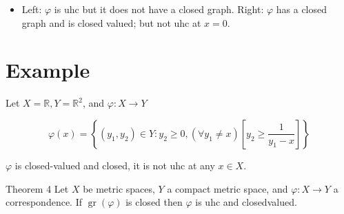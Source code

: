 \documentclass[10pt]{article}
\begin{document}
\begin{itemize}
  \item Left: $\varphi$ is uhc but it does not have a closed graph. Right: $\varphi$ has a closed graph and is closed valued; but not uhc at $x=0$.
\end{itemize}

\section*{Example}
Let $X=\mathbb{R}, Y=\mathbb{R}^{2}$, and $\varphi: X \rightarrow Y$

$$
\varphi(x)=\left\{\left(y_{1}, y_{2}\right) \in Y: y_{2} \geq 0,\left(\forall y_{1} \neq x\right)\left[y_{2} \geq \frac{1}{y_{1}-x}\right]\right\}
$$

$\varphi$ is closed-valued and closed, it is not uhc at any $x \in X$.

Theorem 4 Let $X$ be metric spaces, $Y$ a compact metric space, and $\varphi: X \rightarrow Y$ a correspondence. If $\operatorname{gr}(\varphi)$ is closed then $\varphi$ is uhc and closedvalued.
\end{document}
